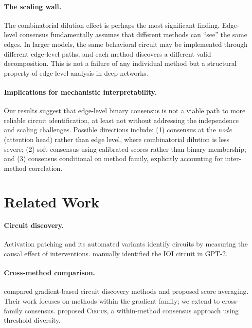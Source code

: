 \documentclass[11pt,a4paper]{article}
\newcommand{\circus}{\textsc{Circus}}
\begin{document}
\paragraph{The scaling wall.}
The combinatorial dilution effect is perhaps the most significant finding.
Edge-level consensus fundamentally assumes that different methods can ``see'' the same edges.
In larger models, the same behavioral circuit may be implemented through different edge-level paths, and each method discovers a different valid decomposition.
This is not a failure of any individual method but a structural property of edge-level analysis in deep networks.

\paragraph{Implications for mechanistic interpretability.}
Our results suggest that edge-level binary consensus is not a viable path to more reliable circuit identification, at least not without addressing the independence and scaling challenges.
Possible directions include: (1) consensus at the \emph{node} (attention head) rather than edge level, where combinatorial dilution is less severe; (2) soft consensus using calibrated scores rather than binary membership; and (3) consensus conditional on method family, explicitly accounting for inter-method correlation.

\section{Related Work}
\label{sec:related}

\paragraph{Circuit discovery.}
Activation patching \citep{vig2020investigating,geiger2021causal} and its automated variants \citep{conmy2023automated,syed2023attribution,hanna2024does} identify circuits by measuring the causal effect of interventions.
\citet{wang2023interpretability} manually identified the IOI circuit in GPT-2.

\paragraph{Cross-method comparison.}
\citet{mondorf2025beyond} compared gradient-based circuit discovery methods and proposed score averaging.
Their work focuses on methods within the gradient family; we extend to cross-family consensus.
\citet{parekh2026circus} proposed \circus{}, a within-method consensus approach using threshold diversity.
\end{document}
